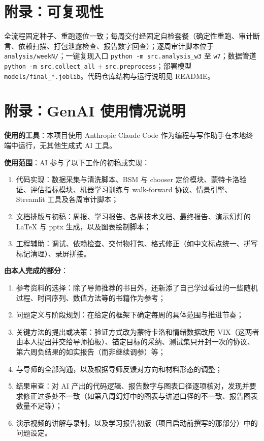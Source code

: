\documentclass[11pt]{ctexart}
\begin{document}
\section*{附录：可复现性}
全流程固定种子、重跑逐位一致；每周交付经固定自检套餐（确定性重跑、审计断言、依赖扫描、打包泄露检查、报告数字回查）；逐周审计脚本位于 \texttt{analysis/weekN/}；一键复现入口 \texttt{python -m src.analysis\_w3} 至 \texttt{w7}；数据管道 \texttt{python -m src.collect\_all} + \texttt{src.preprocess}；部署模型 \texttt{models/final\_*.joblib}。代码仓库结构与运行说明见 README。

\section*{附录：GenAI 使用情况说明}
\textbf{使用的工具}：本项目使用 Anthropic Claude Code 作为编程与写作助手在本地终端中运行，无其他生成式 AI 工具。

\textbf{使用范围}：AI 参与了以下工作的初稿或实现：
\begin{enumerate}
  \item 代码实现：数据采集与清洗脚本、BSM 与 chooser 定价模块、蒙特卡洛验证、评估指标模块、机器学习训练与 walk-forward 协议、情景引擎、Streamlit 工具及各周审计脚本；
  \item 文档排版与初稿：周报、学习报告、各周技术文档、最终报告、演示幻灯的 LaTeX 与 pptx 生成，以及图表绘制脚本；
  \item 工程辅助：调试、依赖检查、交付物打包、格式修正（如中文标点统一、拼写标记清理）、录屏拼接。
\end{enumerate}

\textbf{由本人完成的部分}：
\begin{enumerate}
  \item 参考资料的选择：除了导师推荐的书目外，还新添了自己学过看过的一些随机过程、时间序列、数值方法等的书籍作为参考；
  \item 问题定义与阶段规划：在给定的框架下确定每周的具体范围与推进节奏；
  \item 关键方法的提出或决策：验证方式改为蒙特卡洛和情绪数据改用 VIX（这两者由本人提出并交给导师拍板）、锚定目标的采纳、测试集只开封一次的协议、第六周负结果的如实报告（而非继续调参）等；
  \item 与导师的全部沟通，以及根据导师反馈对方向和材料形态的调整；
  \item 结果审查：对 AI 产出的代码逻辑、报告数字与图表口径逐项核对，发现并要求修正过多处不一致（如第八周幻灯中的图表与讲述口径的不一致、报告图表数量不足等）；
  \item 演示视频的讲解与录制，以及学习报告初版（项目启动前撰写的那部分）中的问题设定。
\end{enumerate}
\end{document}
